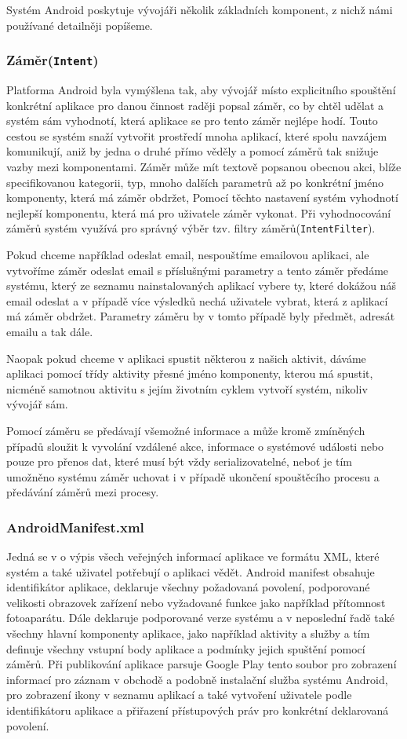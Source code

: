 \documentclass[czech,master,public,dept460,male,java,cpdeclaration]{diploma}
\begin{document}
Systém Android poskytuje vývojáři několik základních komponent, z nichž námi používané detailněji popíšeme.

\subsubsection{Záměr(\texttt{Intent})}
Platforma Android byla vymýšlena tak, aby vývojář místo explicitního spouštění konkrétní aplikace pro danou činnost
raději popsal záměr, co by chtěl udělat a systém sám vyhodnotí, která aplikace se pro tento záměr nejlépe
hodí. Touto cestou se systém snaží vytvořit prostředí mnoha aplikací, které spolu navzájem komunikují,
aniž by jedna o druhé přímo věděly a pomocí záměrů tak snižuje vazby mezi komponentami. Záměr může mít
textově popsanou obecnou akci, blíže specifikovanou kategorii, typ, mnoho dalších parametrů až po konkrétní
jméno komponenty, která má záměr obdržet, Pomocí těchto nastavení systém vyhodnotí nejlepší komponentu,
která má pro uživatele záměr vykonat. Při vyhodnocování záměrů systém využívá pro správný výběr
 tzv. filtry záměrů(\texttt{IntentFilter}).

Pokud chceme například odeslat email, nespouštíme emailovou aplikaci, ale vytvoříme záměr odeslat email
s příslušnými parametry a tento záměr předáme systému, který ze seznamu nainstalovaných aplikací vybere
ty, které dokážou náš email odeslat a v případě více výsledků nechá uživatele vybrat, která z aplikací
má záměr obdržet. Parametry záměru by v tomto případě byly předmět, adresát emailu a tak dále.

Naopak pokud chceme v aplikaci spustit některou z našich aktivit, dáváme aplikaci pomocí třídy
aktivity přesné jméno komponenty, kterou má spustit, nicméně samotnou aktivitu s jejím životním
cyklem vytvoří systém, nikoliv vývojář sám.

Pomocí záměru se předávají všemožné informace a může kromě zmíněných případů sloužit k vyvolání
vzdálené akce, informace o systémové události nebo pouze pro přenos dat, které musí být vždy
serializovatelné, neboť je tím umožněno systému záměr uchovat i v případě ukončení spouštěcího
procesu a předávání záměrů mezi procesy.

\subsubsection{AndroidManifest.xml}
Jedná se v o výpis všech veřejných informací aplikace ve formátu XML, které systém
a také uživatel potřebují o aplikaci vědět. Android manifest obsahuje identifikátor aplikace, deklaruje všechny
požadovaná povolení, podporované velikosti obrazovek zařízení nebo vyžadované funkce jako například přítomnost
fotoaparátu. Dále deklaruje podporované verze systému a v neposlední řadě také všechny hlavní komponenty
aplikace, jako například aktivity a služby a tím definuje všechny vstupní body aplikace a podmínky
jejich spuštění pomocí záměrů. Při publikování aplikace
parsuje Google Play tento soubor pro zobrazení informací pro záznam v obchodě a podobně instalační služba
systému Android, pro zobrazení ikony v seznamu aplikací a také vytvoření uživatele podle identifikátoru
aplikace a přiřazení přístupových práv pro konkrétní deklarovaná povolení.
\end{document}
